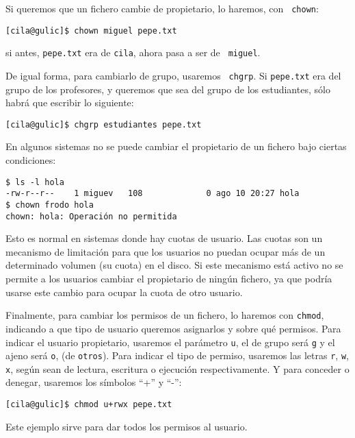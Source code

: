 Si queremos que un fichero cambie de propietario, lo haremos, con {\tt
chown}: 

\begin{verbatim}
[cila@gulic]$ chown miguel pepe.txt
\end{verbatim}

si antes, {\tt pepe.txt} era de {\tt  cila}, ahora pasa a ser de {\tt
miguel}.

De   igual   forma,   para   cambiarlo   de   grupo,   usaremos   {\tt
chgrp}. Si  {\tt pepe.txt} era del  grupo de los
profesores,  y queremos  que sea  del grupo  de los  estudiantes, sólo
habrá que escribir lo siguiente:

\begin{verbatim}
[cila@gulic]$ chgrp estudiantes pepe.txt
\end{verbatim}

En algunos sistemas  no se puede cambiar el propietario  de un fichero
bajo ciertas condiciones:

\begin{verbatim}
$ ls -l hola
-rw-r--r--    1 miguev   108             0 ago 10 20:27 hola
$ chown frodo hola
chown: hola: Operación no permitida
\end{verbatim}

Esto es normal en sistemas donde hay cuotas de usuario. Las cuotas son
un mecanismo de limitación para que  los usuarios no puedan ocupar más
de un  determinado volumen (su cuota)  en el disco. Si  este mecanismo
está activo  no se permite  a los  usuarios cambiar el  propietario de
ningún fichero, ya que podría usarse  este cambio para ocupar la cuota
de otro usuario.

Finalmente, para  cambiar los permisos  de un fichero, lo  haremos con
{\tt chmod},  indicando a  que tipo de  usuario queremos  asignarlos y
sobre qué permisos.  Para indicar el usuario  propietario, usaremos el
parámetro {\tt u}, el  de grupo será {\tt g} y el  ajeno será {\tt o},
(de {\tt otros}). Para indicar el tipo de permiso, usaremos las letras
{\tt  r},  {\tt w},  {\tt  x},  según  sean  de lectura,  escritura  o
ejecución  respectivamente. Y  para conceder  o denegar,  usaremos los
símbolos ``+'' y ``-'':

\begin{verbatim}
[cila@gulic]$ chmod u+rwx pepe.txt
\end{verbatim}

Este ejemplo sirve para dar todos los permisos al usuario.

